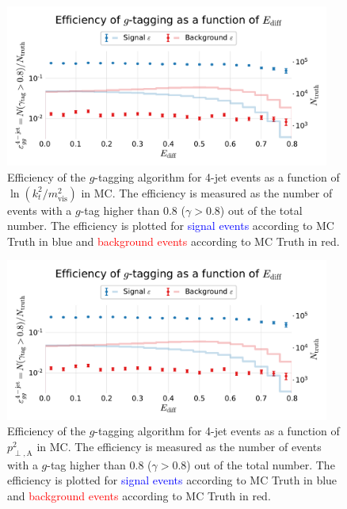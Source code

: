 \begin{figure}
  \centerfloat
  \includegraphics[width=0.95\textwidth, trim=10 10 10 45, clip, page=7]{figures/quarks/efficiency_events-down_sample=1.00-ML_vars=vertex-selection=b-ejet_min=4-n_iter_RS_lgb=99-n_iter_RS_xgb=9-cdot_cut=0.90-version=19-njet=4.pdf}
  \caption[$g$-Tagging Efficiency for 4-Jet Events in MC as a Function of $\ln \left( k_t^2 / m_\mathrm{vis}^2 \right)$]
          {Efficiency of the $g$-tagging algorithm for 4-jet events as a function of $\ln \left( k_t^2 / m_\mathrm{vis}^2 \right)$  in MC. The efficiency is measured as the number of events with a $g$-tag higher than 0.8 ($\gamma > 0.8$) out of the total number. The efficiency is plotted for \textcolor{blue}{signal events} according to MC Truth in blue and \textcolor{red}{background events} according to MC Truth in red.
          } 
  \label{fig:q:effiency_gtag_ln_kt_m_vis}
\end{figure}
\begin{figure}
  \centerfloat
  \includegraphics[width=0.95\textwidth, trim=10 10 10 45, clip, page=8]{figures/quarks/efficiency_events-down_sample=1.00-ML_vars=vertex-selection=b-ejet_min=4-n_iter_RS_lgb=99-n_iter_RS_xgb=9-cdot_cut=0.90-version=19-njet=4.pdf}
  \caption[$g$-Tagging Efficiency for 4-Jet Events in MC as a Function of $p^2_{\perp,\mathrm{A}}$]
          {Efficiency of the $g$-tagging algorithm for 4-jet events as a function of $p^2_{\perp,\mathrm{A}}$  in MC. The efficiency is measured as the number of events with a $g$-tag higher than 0.8 ($\gamma > 0.8$) out of the total number. The efficiency is plotted for \textcolor{blue}{signal events} according to MC Truth in blue and \textcolor{red}{background events} according to MC Truth in red.
          } 
  \label{fig:q:effiency_gtag_pt_antenna}
\end{figure}
